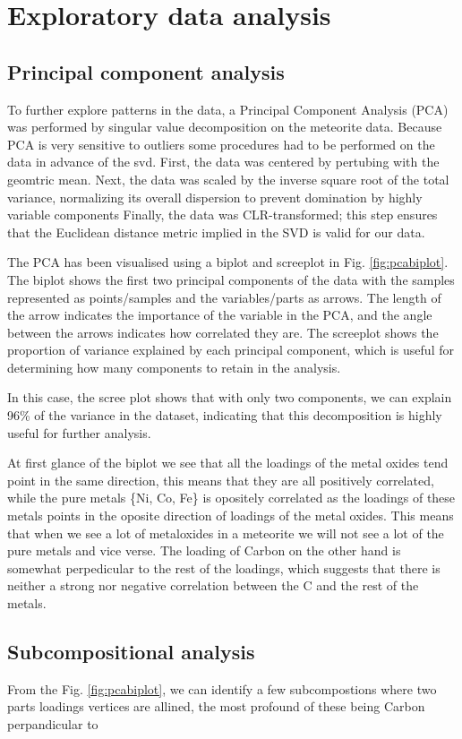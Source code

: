 \section{Exploratory data analysis}

\subsection{Principal component analysis }

To further explore patterns in the data, a Principal Component Analysis (PCA) was performed by singular value decomposition on the meteorite data.
Because PCA is very sensitive to outliers some procedures had to be performed on the data in advance of the svd. First,
the data was centered by pertubing with the geomtric mean. Next, the data was scaled by the inverse square 
root of the total variance, normalizing its overall dispersion to prevent domination by highly variable components Finally, 
the data was CLR-transformed; this step ensures that the Euclidean distance metric implied in the SVD is valid for our data.  

The PCA has been visualised using a biplot and screeplot in Fig. \ref{fig:pcabiplot}. The biplot shows the first two principal components of the data with the samples
represented as points/samples and the variables/parts as arrows. The length of the arrow indicates the importance of the variable in the PCA, and the angle between the arrows indicates how correlated they are.
The screeplot shows the proportion of variance explained by each principal component, which is useful for determining how many components to retain in the analysis. 

In this case, the scree plot shows that with only two components, we can explain 96\% of the variance in the dataset, indicating that this decomposition is highly useful for further analysis.

At first glance of the biplot we see that all the loadings of the metal oxides tend point in the same direction, this means that they are all positively correlated, while the pure metals \{Ni, Co, Fe\} is opositely correlated as the loadings of these metals points in the oposite direction of loadings of the metal oxides. This means that when we see a lot of metaloxides in a meteorite we will not see a lot of the pure metals and vice verse. The loading of Carbon on the other hand is somewhat 
perpedicular to the rest of the loadings, which suggests that there is neither a strong nor negative correlation between the 
C and the rest of the metals. 



\subsection{Subcompositional analysis }

From the Fig. \ref{fig:pcabiplot}, we can identify a few subcompostions where two parts loadings vertices 
are allined, the most profound of these being Carbon perpandicular to 


